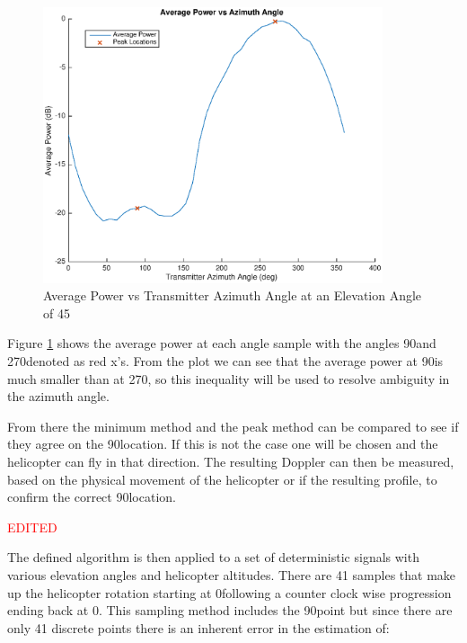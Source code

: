 \begin{figure}
	\begin{center}
		\includegraphics[width=10cm]{images/results/average_power_vs_Azimuth.eps}
		\caption{Average Power vs Transmitter Azimuth Angle at an Elevation Angle of 45\textdegree}
		\label{fig:ave_power}
	\end{center}
\end{figure}

Figure \ref{fig:ave_power}  shows the average power at each angle sample with the angles 90\textdegree \space and 270\textdegree \space denoted as red x's. From the plot we can see that the average power at 90\textdegree \space is much smaller than at 270\textdegree, so this inequality will be used to resolve ambiguity in the azimuth angle. 

From there the minimum method and the peak method can be compared to see if they agree on the 90\textdegree \space location. If this is not the case one will be chosen and the helicopter can fly in that direction. The resulting Doppler can then be measured, based on the physical movement of the helicopter or if the resulting profile, to confirm the correct 90\textdegree \space location. 

\textcolor{red}{EDITED}

The defined algorithm is then applied to a set of deterministic signals with various elevation angles and helicopter altitudes. There are 41 samples that make up the helicopter rotation starting at 0\textdegree \space following a counter clock wise progression ending back at 0\textdegree. This sampling method includes the 90\textdegree \space point but since there are only 41 discrete points there is an inherent error in the estimation of:

